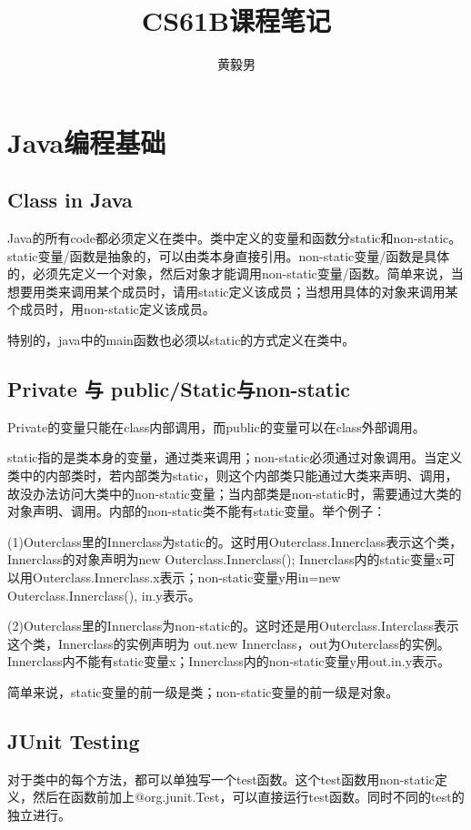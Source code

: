 \documentclass{article}
\title{\heiti CS61B课程笔记}
\author{黄毅男}
\date{}
\begin{document}
	\maketitle
	\tableofcontents
	\section{Java编程基础}
	\subsection{Class in Java}
	Java的所有code都必须定义在类中。类中定义的变量和函数分static和non-static。static变量/函数是抽象的，可以由类本身直接引用。non-static变量/函数是具体的，必须先定义一个对象，然后对象才能调用non-static变量/函数。简单来说，当想要用类来调用某个成员时，请用static定义该成员；当想用具体的对象来调用某个成员时，用non-static定义该成员。
	
	特别的，java中的main函数也必须以static的方式定义在类中。
	\subsection{Private 与 public/Static与non-static}
	Private的变量只能在class内部调用，而public的变量可以在class外部调用。
	
	static指的是类本身的变量，通过类来调用；non-static必须通过对象调用。当定义类中的内部类时，若内部类为static，则这个内部类只能通过大类来声明、调用，故没办法访问大类中的non-static变量；当内部类是non-static时，需要通过大类的对象声明、调用。内部的non-static类不能有static变量。举个例子：
	
	(1)Outerclass里的Innerclass为static的。这时用Outerclass.Innerclass表示这个类，Innerclass的对象声明为new Outerclass.Innerclass(); Innerclass内的static变量x可以用Outerclass.Innerclass.x表示；non-static变量y用in=new Outerclass.Innerclass(), in.y表示。
	
	(2)Outerclass里的Innerclass为non-static的。这时还是用Outerclass.Interclass表示这个类，Innerclass的实例声明为 out.new Innerclass，out为Outerclass的实例。Innerclass内不能有static变量x；Innerclass内的non-static变量y用out.in.y表示。
	
	简单来说，static变量的前一级是类；non-static变量的前一级是对象。
	\subsection{JUnit Testing}
	对于类中的每个方法，都可以单独写一个test函数。这个test函数用non-static定义，然后在函数前加上@org.junit.Test，可以直接运行test函数。同时不同的test的独立进行。
	
\end{document}
